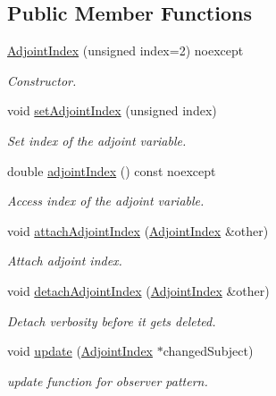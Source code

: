 \subsection*{Public Member Functions}
\begin{DoxyCompactItemize}
\item 
\hyperlink{classSpacy_1_1Mixin_1_1AdjointIndex_a18dca16025bfc2af67da2eee34be9699_a18dca16025bfc2af67da2eee34be9699}{Adjoint\+Index} (unsigned index=2) noexcept
\begin{DoxyCompactList}\small\item\em Constructor. \end{DoxyCompactList}\item 
void \hyperlink{classSpacy_1_1Mixin_1_1AdjointIndex_a30d4dd8b61175144c84c5bbf964528d7_a30d4dd8b61175144c84c5bbf964528d7}{set\+Adjoint\+Index} (unsigned index)
\begin{DoxyCompactList}\small\item\em Set index of the adjoint variable. \end{DoxyCompactList}\item 
double \hyperlink{classSpacy_1_1Mixin_1_1AdjointIndex_afd5c0f6bd67d20c88ea65b7f8fe4ab45_afd5c0f6bd67d20c88ea65b7f8fe4ab45}{adjoint\+Index} () const noexcept
\begin{DoxyCompactList}\small\item\em Access index of the adjoint variable. \end{DoxyCompactList}\item 
void \hyperlink{classSpacy_1_1Mixin_1_1AdjointIndex_a6ac8bb62f7d40cdf7aee68539026a647_a6ac8bb62f7d40cdf7aee68539026a647}{attach\+Adjoint\+Index} (\hyperlink{classSpacy_1_1Mixin_1_1AdjointIndex}{Adjoint\+Index} \&other)
\begin{DoxyCompactList}\small\item\em Attach adjoint index. \end{DoxyCompactList}\item 
\hypertarget{classSpacy_1_1Mixin_1_1AdjointIndex_af07504e2900cd83446469b4bb0ce0a4a}{}void \hyperlink{classSpacy_1_1Mixin_1_1AdjointIndex_af07504e2900cd83446469b4bb0ce0a4a}{detach\+Adjoint\+Index} (\hyperlink{classSpacy_1_1Mixin_1_1AdjointIndex}{Adjoint\+Index} \&other)\label{classSpacy_1_1Mixin_1_1AdjointIndex_af07504e2900cd83446469b4bb0ce0a4a}

\begin{DoxyCompactList}\small\item\em Detach verbosity before it gets deleted. \end{DoxyCompactList}\item 
\hypertarget{classSpacy_1_1Mixin_1_1AdjointIndex_ad91ccf68601950801cd062afee8a8cf2}{}void \hyperlink{classSpacy_1_1Mixin_1_1AdjointIndex_ad91ccf68601950801cd062afee8a8cf2}{update} (\hyperlink{classSpacy_1_1Mixin_1_1AdjointIndex}{Adjoint\+Index} $\ast$changed\+Subject)\label{classSpacy_1_1Mixin_1_1AdjointIndex_ad91ccf68601950801cd062afee8a8cf2}

\begin{DoxyCompactList}\small\item\em update function for observer pattern. \end{DoxyCompactList}\end{DoxyCompactItemize}
